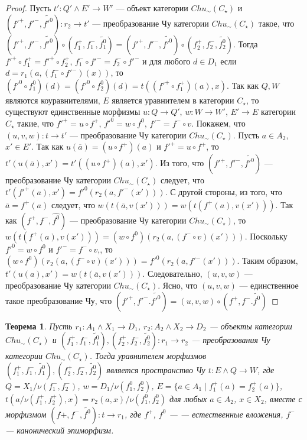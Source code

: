 \documentclass[a4paper,12pt]{article}
\newtheorem{theorem}{Теорема}
\begin{document}
\begin{proof}
    Пусть $t': Q' \wedge E' \to W'$ --- объект категории $Chu_\sim(C_\star)$ и $(f'^+,f'^-,\widetilde{f'^0}): r_2 \to t'$ --- преобразование Чу категории $Chu_\sim(C_\star)$ такое, что $(f'^+,f'^-,\widetilde{f'^0}) \circ (f_1^+,f_1^-,\widetilde{f_1^0}) = (f'^+,f'^-,\widetilde{f'^0}) \circ (f_2^+,f_2^-,\widetilde{f_2^0})$. Тогда $f'^+ \circ f_1^+ = f'^+ \circ f_2^+$, $f_1^- \circ f'^- = f_2^- \circ f'^-$ и для любого $d \in D_1$ если $d = r_1(a,(f_1^- \circ f'^-)(x))$, то $(f'^0 \circ f_1^0)(d) = (f'^0 \circ f_2^0)(d) = t((f'^+ \circ f_1^+)(a),x)$. Так как $Q,W$ являются коуравнителями, $E$ является уравнителем в категории $C_\star$, то существуют единственные морфизмы $u: Q \to Q'$, $w: W \to W'$, $E' \to E$ категории $C_\star$ такие, что $f'^+ = u \circ f^+$, $f'^0 = w \circ f^0$, $f'^- = f^- \circ v$. Покажем, что $(u,v,w): t \to t'$ --- преобразование Чу категории $Chu_\sim(C_\star)$. Пусть $a \in A_2$, $x' \in E'$. Так как $u(\overline{a}) = (u \circ f^+)(a)$ и $f'^+ = u \circ f^+$, то $t'(u(\overline{a}),x') = t'((u \circ f^+)(a),x')$. Из того, что $(f'^+,f'^-,\widetilde{f'^0})$ --- преобразование Чу категории $Chu_\sim(C_\star)$ следует, что $t'(f'^+(a),x') = f'^0(r_2(a,f'^-(x')))$. С другой стороны, из того, что $\overline{a} = f^+(a)$ следует, что $w(t(\overline{a},v(x'))) = w(t(f^+(a),v(x')))$. Так как $(f^+,f^-,\widehat{f^0})$ --- преобразование Чу категории $Chu_\sim(C_\star)$, то $w(t(f^+(a),v(x'))) = (w \circ f^0)(r_2(a,(f^- \circ v)(x')))$. Поскольку $f'^0 = w \circ f^0$ и $f'^- = f^- \circ v$,, то $(w \circ f^0)(r_2(a,(f^- \circ v)(x'))) = f'^0(r_2(a,f'^-(x')))$. Таким образом, $t'(u(a),x') = w(t(\overline{a},v(x')))$. Следовательно, $(u,v,w)$ --- преобразование Чу категории $Chu_\sim(C_\star)$. Ясно, что $(u,v,w)$ --- единственное такое преобразование Чу, что $(f'^+,f'^-.\widetilde{f'^0}) = (u,v,w) \circ (f^+,f^-.\widetilde{f^0})$ 
\end{proof}

\begin{theorem}
    Пусть $r_1: A_1 \wedge X_1 \to D_1$, $r_2: A_2 \wedge X_2 \to D_2$ --- объекты категории $Chu_\sim(C_\star)$ и $(f_1^+,f_1^-,\widetilde{f_1^0}), (f_2^+,f_2^-,\widetilde{f_2^0}): r_1 \to r_2$ --- преобразования Чу категории $Chu_\sim(C_\star)$. Тогда уравнителем морфизмов $(f_1^+,f_1^-,\widetilde{f_1^0}), (f_2^+,f_2^-,\widetilde{f_2^0})$ является пространство Чу $t: E \wedge Q \to W$, где $Q = X_1/\nu(f_1^-,f_2^-)$, $w = D_1/\nu(f_1^0,f_2^0)$, $E = \{a \in A_1 \mid f_1^+(a) = f_2^+(a)\}$, $t(a/\nu(f_1^+,f_2^+),x) = r_2(a,x)/\nu(f_1^0,f_2^0)$ для любых $a \in A_2$, $x \in X_2$, вместе с морфизмом $(f+,f^-,\widetilde{f^0}): t \to r_1$, где $f^+$, $f^0$ ---  --- естественные вложения, $f^-$ --- канонический эпиморфизм. 
\end{theorem}
\end{document}
